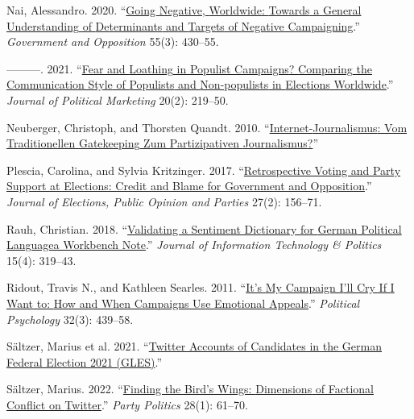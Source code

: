 \documentclass[a4paper,11pt]{article}
\newlength{\cslhangindent}
\newenvironment{CSLReferences}[2] %
 {\setlength{\cslhangindent}{#2\parindent}%
  \setlength{\parindent}{0pt}%
  \everypar{\setlength{\hangindent}{\cslhangindent}}\ignorespaces}
 {\par}
\begin{document}
\begin{CSLReferences}{1}{0}
\leavevmode{}%
Nai, Alessandro. 2020. {``\href{https://doi.org/10.1017/gov.2018.32}{Going {Negative}, {Worldwide}: {Towards} a {General Understanding} of {Determinants} and {Targets} of {Negative Campaigning}}.''} \emph{Government and Opposition} 55(3): 430--55.

\leavevmode{}%
---------. 2021. {``\href{https://doi.org/10.1080/15377857.2018.1491439}{Fear and {Loathing} in {Populist Campaigns}? {Comparing} the {Communication Style} of {Populists} and {Non-populists} in {Elections Worldwide}}.''} \emph{Journal of Political Marketing} 20(2): 219--50.

\leavevmode{}%
Neuberger, Christoph, and Thorsten Quandt. 2010. {``\href{https://doi.org/10.1007/978-3-531-92437-3_3}{Internet-{Journalismus}: {Vom} Traditionellen {Gatekeeping} Zum Partizipativen {Journalismus}?}''}

\leavevmode{}%
Plescia, Carolina, and Sylvia Kritzinger. 2017. {``\href{https://doi.org/10.1080/17457289.2016.1243543}{Retrospective Voting and Party Support at Elections: Credit and Blame for Government and Opposition}.''} \emph{Journal of Elections, Public Opinion and Parties} 27(2): 156--71.

\leavevmode{}%
Rauh, Christian. 2018. {``\href{https://doi.org/10.1080/19331681.2018.1485608}{Validating a Sentiment Dictionary for {German} Political Language\textemdash a Workbench Note}.''} \emph{Journal of Information Technology \& Politics} 15(4): 319--43.

\leavevmode{}%
Ridout, Travis N., and Kathleen Searles. 2011. {``\href{https://doi.org/10.1111/j.1467-9221.2010.00819.x}{It's {My Campaign I}'ll {Cry} If {I Want} to: {How} and {When Campaigns Use Emotional Appeals}}.''} \emph{Political Psychology} 32(3): 439--58.

\leavevmode{}%
Sältzer, Marius et al. 2021. {``\href{https://doi.org/10.4232/1.13790}{Twitter Accounts of Candidates in the {German} Federal Election 2021 ({GLES})}.''}

\leavevmode{}%
Sältzer, Marius. 2022. {``\href{https://doi.org/10.1177/1354068820957960}{Finding the Bird's Wings: {Dimensions} of Factional Conflict on {Twitter}}.''} \emph{Party Politics} 28(1): 61--70.


\end{CSLReferences}
\end{document}
